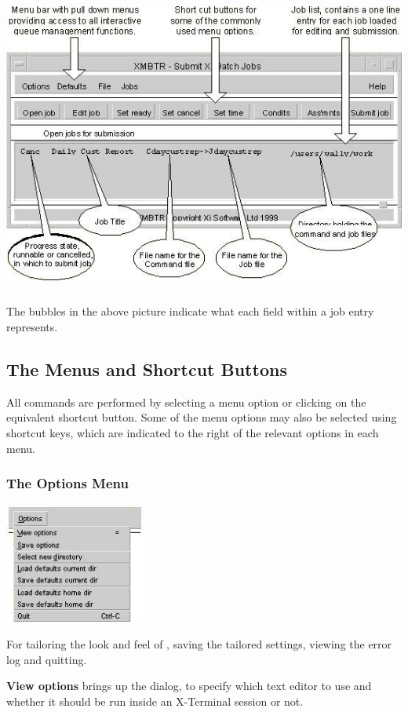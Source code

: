  \includegraphics[width=14.085cm,height=9.865cm]{img/ref39.jpg} 

The bubbles in the above picture indicate what each field within a job entry represents.

\subsection{The Menus and Shortcut Buttons}
All commands are performed by selecting a menu option or clicking on the equivalent shortcut button. Some of the menu options may also be
selected using shortcut keys, which are indicated to the right of the relevant options in each menu.

\subsubsection{The Options Menu}
\includegraphics[width=4.657cm,height=3.941cm]{img/ref40.jpg}

For tailoring the look and feel of \PrXmbtr{}, saving the tailored settings, viewing the error log and quitting.

\textbf{View options} brings up the dialog, to specify which text editor to use and whether it should be run inside an X-Terminal session or not.

